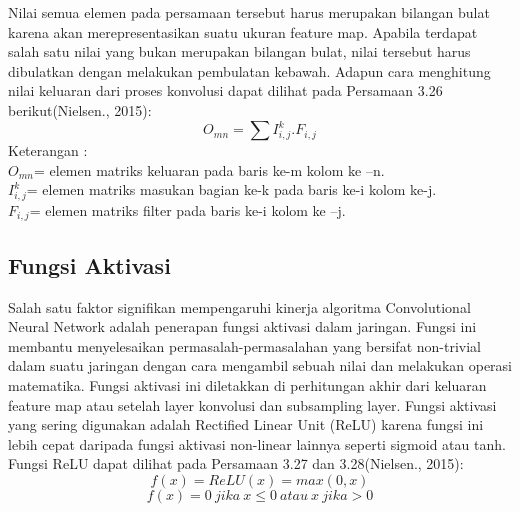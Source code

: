 Nilai semua elemen pada persamaan tersebut harus merupakan bilangan bulat karena akan merepresentasikan suatu ukuran feature map. Apabila terdapat salah satu nilai yang bukan merupakan bilangan bulat, nilai tersebut harus dibulatkan dengan melakukan pembulatan kebawah. Adapun cara menghitung nilai keluaran dari proses konvolusi dapat dilihat pada Persamaan 3.26 berikut(Nielsen., 2015):
\begin{equation}
O_{mn}=\sum I^k_{i,j} . F_{i,j}
\end{equation}
Keterangan :
\\
\(O_{mn}\)= elemen matriks keluaran pada baris ke-m kolom ke –n.
\\
\(I^k_{i,j}\)= elemen matriks masukan bagian ke-k pada baris ke-i kolom ke-j. 
\\
\(F_{i,j}\)= elemen matriks filter pada baris ke-i kolom ke –j.
\subsection{Fungsi Aktivasi}
Salah satu faktor signifikan mempengaruhi kinerja algoritma Convolutional Neural Network adalah penerapan fungsi aktivasi dalam jaringan. Fungsi ini membantu menyelesaikan permasalah-permasalahan yang bersifat non-trivial dalam suatu jaringan dengan cara mengambil sebuah nilai dan melakukan operasi matematika. Fungsi aktivasi ini diletakkan di perhitungan akhir dari keluaran feature map atau setelah layer konvolusi dan subsampling layer. Fungsi aktivasi yang sering digunakan adalah Rectified Linear Unit (ReLU) karena fungsi ini lebih cepat daripada fungsi aktivasi non-linear lainnya seperti sigmoid atau tanh. Fungsi ReLU dapat dilihat pada Persamaan 3.27 dan 3.28(Nielsen., 2015):
\begin{equation}
f(x) = ReLU(x) =max(0,x)
\end{equation}
\begin{equation}
	f(x)= 0 \ jika \ x \leq{0} \ atau \ x \ jika > 0
\end{equation}
